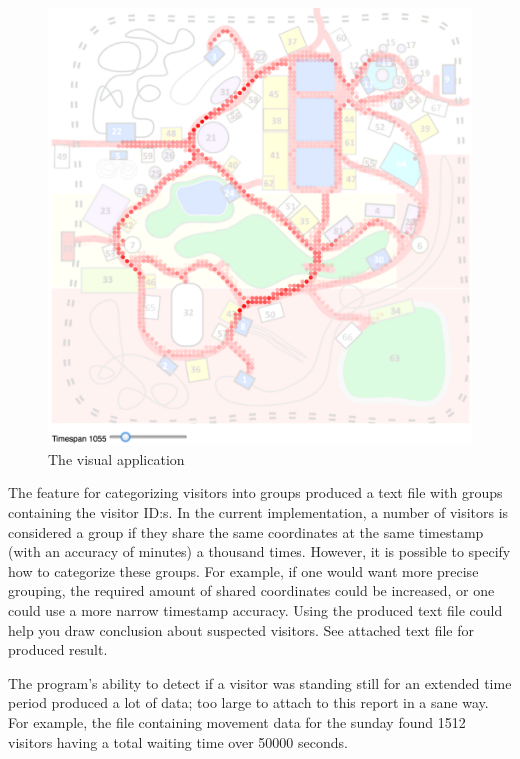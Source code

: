 \documentclass[journal]{vgtc}                %
\begin{document}
\begin{figure}[h!]
  \begin{center}
    \includegraphics[scale=0.4]{img/pic.png}
    \caption{\label{fig:pc}The visual application}

  \end{center}
\end{figure}

The feature for categorizing visitors into groups produced a text file with groups containing  the visitor ID:s. In the current implementation, a number of visitors is considered a group if they share the same coordinates at the same timestamp (with an accuracy of minutes) a thousand times. However, it is possible to specify how to categorize these groups. For example, if one would want more precise grouping, the required amount of shared coordinates could be increased, or one could use a more narrow timestamp accuracy. Using the produced text file could help you draw conclusion about suspected visitors. See attached text file for produced result.

The program's ability to detect if a visitor was standing still for an extended time period produced a lot of data; too large to attach to this report in a sane way. For example, the file containing movement data for the sunday found 1512 visitors having a total waiting time over 50000 seconds.
\end{document}
